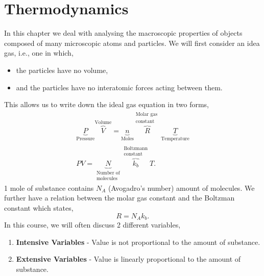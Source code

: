 \documentclass{book}
\begin{document}
\chapter{Thermodynamics}
In this chapter we deal with analysing the macroscopic properties of objects composed of many microscopic atoms and particles. We will first consider an idea gas, i.e., one in which,
\begin{itemize}
	\item the particles have no volume,
	\item and the particles have no interatomic forces acting between them.
\end{itemize}
This allows us to write down the ideal gas equation in two forms,
\begin{align}
	\boxed{\underbrace{P}_{\text{Pressure}}\overbrace{V}^{\text{Volume}} = \underbrace{n}_{\text{Moles}}\overbrace{R}^{\substack{\text{Molar gas }\\{\text{constant}}}}\underbrace{T}_{\text{Temperature}}} \\
	\boxed{PV = \underbrace{N}_{\substack{\text{Number of}\\\text{molecules}}} \overbrace{k_b}^{\substack{\text{Boltzmann}\\\text{constant}} } T}.
\end{align}
1 mole of substance contains $N_A$ (Avogadro's number) amount of molecules. We further have a relation between the molar gas constant and the Boltzman constant which states,
\begin{equation}
	R = N_Ak_b.
\end{equation}
In this course, we will often discuss 2 different variables,
\begin{enumerate}
	\item \textbf{Intensive Variables} - Value is not proportional to the amount of substance.
	\item \textbf{Extensive Variables} - Value is linearly proportional to the amount of substance. 
\end{enumerate}
\end{document}
